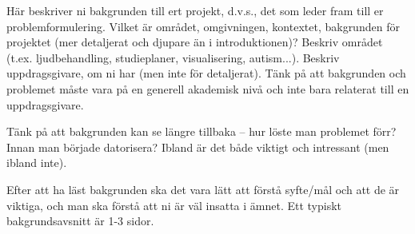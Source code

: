 Här beskriver ni bakgrunden till ert projekt, d.v.s., det som leder fram till er problemformulering.  Vilket är området, omgivningen, kontextet, bakgrunden för projektet (mer detaljerat och djupare än i introduktionen)?  Beskriv området (t.ex. ljudbehandling, studieplaner, visualisering, autism...).  Beskriv uppdragsgivare, om ni har (men inte för detaljerat).  Tänk på att bakgrunden och problemet måste vara på en generell akademisk nivå och inte bara relaterat till en uppdragsgivare.

Tänk på att bakgrunden kan se längre tillbaka -- hur löste man problemet förr? Innan man började datorisera? Ibland är det både viktigt och intressant (men ibland inte).

Efter att ha läst bakgrunden ska det vara lätt att förstå syfte/mål och att de är viktiga, och man ska förstå att ni är väl insatta i ämnet.
Ett typiskt bakgrundsavsnitt är 1-3 sidor.

